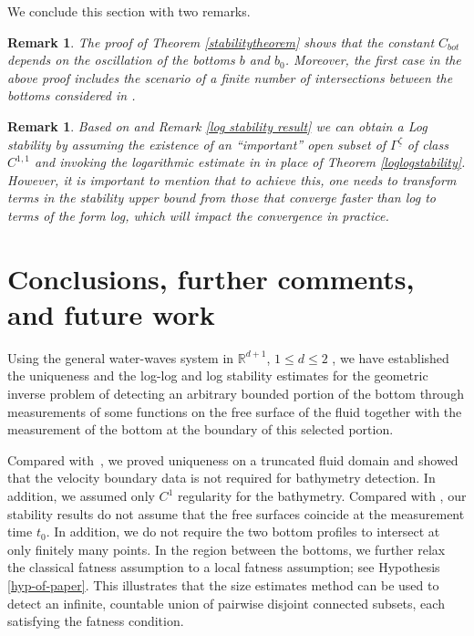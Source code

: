 \documentclass[11pt]{article}
\newtheorem{remark}[theorem]{Remark}
\begin{document}
We conclude this section with two remarks.
\begin{remark}
	The proof of Theorem \ref{stabilitytheorem}  shows that the constant $C_{bot}$ depends on the oscillation of the bottoms $b$ and $b_0$. Moreover, the first case in the above proof includes the scenario of a finite number of intersections between the bottoms considered in \cite{lecaros2020stability}. %
\end{remark}
\begin{remark}\label{possiblelogstability}  
Based on \cite[Section 5]{lecaros2020stability} and  Remark \ref{log stability result} we can obtain a Log stability by assuming the existence of an ``important'' open subset of $\Gamma^{\underline{\zeta}}$ of class $C^{1,1}$ and invoking the logarithmic estimate in \cite[Theorem 2]{bourgeois2010about} in place of Theorem \ref{loglogstability}. However, it is important to mention that to achieve this, one needs to transform terms in the stability upper bound from those that converge faster than log to terms of the form log, which will impact the convergence in practice.
\end{remark}
























\section{Conclusions, further comments, and future work}\label{sec:conclusions}
Using the general water-waves system in $\mathbb{R} ^{d+1}$, $1\le d\le 2$  \cite{lannes2013water}, we have established the uniqueness and the log-log and log stability estimates for the geometric inverse problem of detecting an arbitrary bounded portion of the bottom through measurements of some functions on the free surface of the fluid   together with the measurement of the bottom at the boundary of this selected portion. 


Compared with~\cite{fontelos2017bottom}, we proved uniqueness on a truncated fluid domain and showed that the velocity boundary data is not required for bathymetry detection. In addition, we assumed only $C^{1}$ regularity  for the bathymetry. Compared with  \cite{lecaros2020stability}, our stability results do not assume that the free surfaces coincide at the measurement time $t_{0}$. In addition, we do not require the two bottom profiles to intersect at only finitely many points. In the region between the bottoms, we further relax the classical fatness assumption to a local fatness assumption; see Hypothesis \ref{hyp-of-paper}. This illustrates that the  size estimates method can be  used to detect an infinite, countable union of pairwise disjoint connected subsets, each satisfying the fatness condition.
\end{document}
